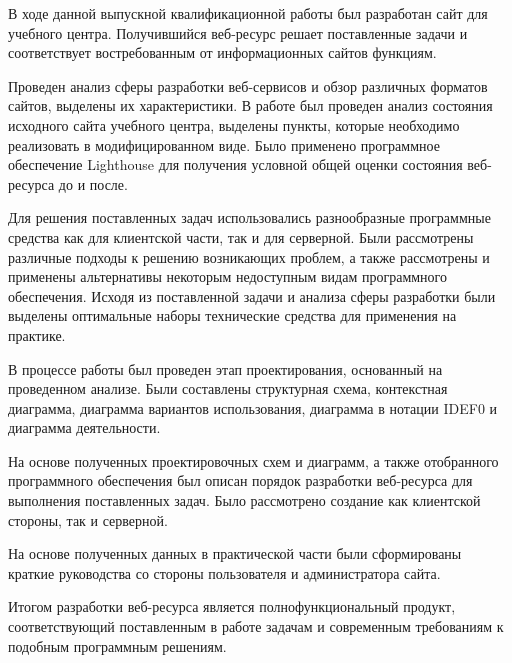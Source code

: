 
В ходе данной выпускной квалификационной работы был разработан сайт для учебного центра.
Получившийся веб-ресурс решает поставленные задачи и соответствует востребованным от информационных сайтов функциям.

Проведен анализ сферы разработки веб-сервисов и обзор различных форматов сайтов, выделены их характеристики.
В работе был проведен анализ состояния исходного сайта учебного центра, выделены пункты, которые необходимо реализовать в модифицированном виде.
Было применено программное обеспечение Lighthouse для получения условной общей оценки состояния веб-ресурса до и после.

Для решения поставленных задач использовались разнообразные программные средства как для клиентской части, так и для серверной.
Были рассмотрены различные подходы к решению возникающих проблем, а также рассмотрены и применены альтернативы некоторым недоступным видам программного обеспечения.
Исходя из поставленной задачи и анализа сферы разработки были выделены оптимальные наборы технические средства для применения на практике.

В процессе работы был проведен этап проектирования, основанный на проведенном анализе.
Были составлены структурная схема, контекстная диаграмма, диаграмма вариантов использования, диаграмма в нотации IDEF0 и диаграмма деятельности.

На основе полученных проектировочных схем и диаграмм, а также отобранного программного обеспечения был описан порядок разработки веб-ресурса для выполнения поставленных задач.
Было рассмотрено создание как клиентской стороны, так и серверной.

На основе полученных данных в практической части были сформированы краткие руководства со стороны пользователя и администратора сайта.

Итогом разработки веб-ресурса является полнофункциональный продукт, соответствующий поставленным в работе задачам и современным требованиям к подобным программным решениям.

\clearpage

